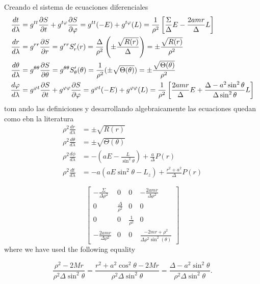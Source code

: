 Creando el sistema de ecuaciones diferenciales
\begin{align}
\frac{d t}{d \lambda} & = g^{t t}\frac{\partial S}{\partial t} + g^{t \varphi}\frac{\partial S}{\partial \varphi} = g^{t t}(-E) + g^{t \varphi}(L) = \frac{1}{\rho^2}\left[\frac{\Sigma}{\Delta}E - \frac{2 a m r}{\Delta} L\right] \\
\frac{d r}{d \lambda} & = g^{r r}\frac{\partial S}{\partial r} = g^{r r} S_r^{\prime}(r) = \frac{\Delta}{\rho^2} \left(\pm \frac{\sqrt{R(r)}}{\Delta}\right) = \pm \frac{\sqrt{R(r)}}{\rho^2} \\
\frac{d \theta}{d \lambda} & = g^{\theta \theta}\frac{\partial S}{\partial \theta} = g^{\theta \theta} S_\theta^{\prime}(\theta) = \frac{1}{\rho^2}(\pm \sqrt{\Theta(\theta )}) = \pm \frac{\sqrt{\Theta(\theta )}}{\rho^2} \\
\frac{d \varphi}{d \lambda} & = g^{\varphi t}\frac{\partial S}{\partial t} + g^{\varphi \varphi}\frac{\partial S}{\partial \varphi} = g^{\varphi t}(-E) + g^{\varphi \varphi}(L) = \frac{1}{\rho^2}\left[\frac{2 a m r}{\Delta}E + \frac{\Delta-a^2 \sin ^2 \theta}{ \Delta \sin ^2 \theta}  L\right]
\end{align}
tom
ando las definiciones y desarrollando algebraicamente las ecuaciones quedan como ebn la literatura 
\begin{equation}
\begin{aligned}
\rho^2 \frac{d r}{d \lambda}&= \pm \sqrt{R(r)} \\
\rho^2 \frac{d \theta}{d \lambda}&= \pm \sqrt{\Theta(\theta)} \\
\rho^2 \frac{d \phi}{d \lambda}&=-\left(a E-\frac{L}{\sin ^2 \theta}\right)+\frac{a}{\Delta} P(r) \\
\rho^2 \frac{d t}{d \lambda}&=-a\left(a E \sin ^2 \theta-L_z\right)+\frac{r^2+a^2}{\Delta} P(r)
\end{aligned}
\end{equation}

\begin{equation}
    \left[\begin{matrix}- \frac{\Sigma}{\Delta \rho^2} & 0 & 0 & - \frac{2 a m r}{\Delta \rho^2}\\0 & \frac{\Delta}{\rho^2} & 0 & 0\\0 & 0 & \frac{1}{\rho^2} & 0\\- \frac{2 a m r}{\Delta \rho^2} & 0 & 0 & \frac{- 2 m r + \rho^2}{\Delta \rho^2 \sin^{2}{\left(\theta \right)}}\end{matrix}\right]
\end{equation}
where we have used the following equality

$$
\frac{\rho^2-2 M r}{\rho^2 \Delta \sin ^2 \theta}=\frac{r^2+a^2 \cos ^2 \theta-2 M r}{\rho^2 \Delta \sin ^2 \theta}=\frac{\Delta-a^2 \sin ^2 \theta}{\rho^2 \Delta \sin ^2 \theta} .
$$




